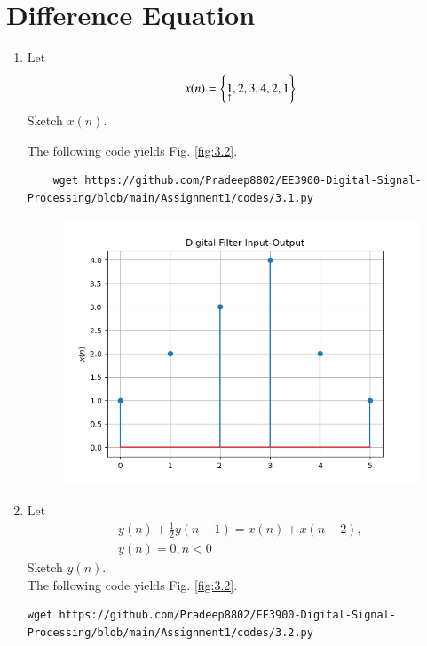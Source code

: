 \documentclass[journal,12pt,twocolumn]{IEEEtran}
\renewcommand\thesection{\arabic{section}}
\begin{document}
\section{Difference Equation}
\begin{enumerate}[label=\thesection.\arabic*,ref=\thesection.\theenumi]
\item Let
\begin{equation}
x(n) = \left\{\underset{\uparrow}{1},2,3,4,2,1\right\}
\end{equation}
Sketch $x(n)$.

\solution The following code yields Fig. \ref{fig:3.2}.
\begin{lstlisting}
	wget https://github.com/Pradeep8802/EE3900-Digital-Signal-Processing/blob/main/Assignment1/codes/3.1.py
\end{lstlisting} 
	\begin{figure}[!ht]
	\begin{center}
		\includegraphics[width=\columnwidth]{./figs/3.1}
	\end{center}
	\label{fig:3.1}	
\end{figure}
\item Let
\begin{multline}
\label{eq:iir_filter}
y(n) + \frac{1}{2}y(n-1) = x(n) + x(n-2), 
\\
 y(n) = 0, n < 0
\end{multline}
Sketch $y(n)$.
\\
\solution The following code yields Fig. \ref{fig:3.2}.
\begin{lstlisting}
wget https://github.com/Pradeep8802/EE3900-Digital-Signal-Processing/blob/main/Assignment1/codes/3.2.py

\end{lstlisting}
\end{enumerate}
\end{document}
